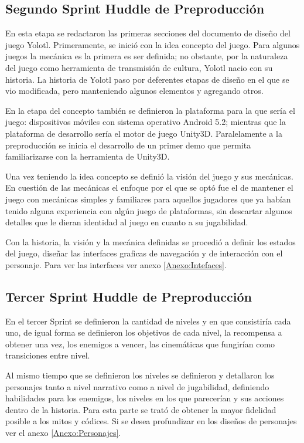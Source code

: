 \subsection{Segundo Sprint Huddle de Preproducción}
En esta etapa se redactaron las primeras secciones del documento de diseño del 
juego Yolotl. Primeramente, se inició con la idea concepto del juego. Para algunos 
juegos la mecánica es la primera es ser definida; no obstante, por la naturaleza 
del juego como herramienta de transmisión de cultura, Yolotl nacio con su historia. 
La historia de Yolotl paso por deferentes etapas de diseño en el que se vio 
modificada, pero manteniendo algunos elementos y agregando otros. 
\\
\par
En la etapa del concepto también se definieron la plataforma para la que sería 
el juego: dispositivos móviles con sistema operativo Android 5.2; mientras que 
la plataforma de desarrollo sería el motor de juego Unity3D. Paralelamente a la 
preproducción se inicia el desarrollo de un primer demo que permita familiarizarse 
con la herramienta de Unity3D.
\\
\par
Una vez teniendo la idea concepto se definió la visión del juego y sus mecánicas. 
En cuestión de las mecánicas el enfoque por el que se optó fue el de mantener 
el juego con mecánicas simples y familiares para aquellos jugadores que ya habían 
tenido alguna experiencia con algún juego de plataformas, sin descartar algunos 
detalles que le dieran identidad al juego en cuanto a su jugabilidad. 
\\
\par
Con la historia, la visión y la mecánica definidas se procedió a definir los 
estados del juego, diseñar las interfaces graficas de navegación y de interacción 
con el personaje. Para ver las interfaces ver anexo \ref{Anexo:Intefaces}.

\subsection{Tercer Sprint Huddle de Preproducción}
En el tercer Sprint se definieron la cantidad de niveles y en que consistiría 
cada uno, de igual forma se definieron los objetivos de cada nivel, la recompensa 
a obtener una vez, los enemigos a vencer, las cinemáticas que fungirían como 
transiciones entre nivel.  
\\
\par

Al mismo tiempo que se definieron los niveles se definieron y detallaron los 
personajes tanto a nivel narrativo como a nivel de jugabilidad, definiendo habilidades 
para los enemigos, los niveles en los que parecerían y sus acciones dentro de 
la historia. Para esta parte se trató de obtener la mayor fidelidad posible a 
los mitos y códices. Si se desea profundizar en los diseños de personajes ver el 
anexo \ref{Anexo:Personajes}.

